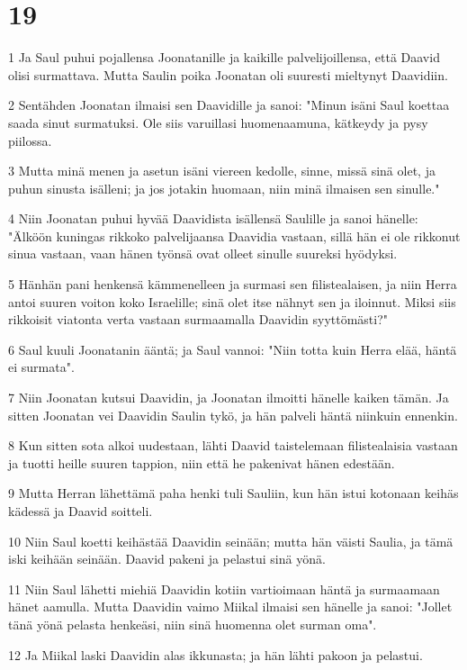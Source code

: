 \chapter{19}

\par 1 Ja Saul puhui pojallensa Joonatanille ja kaikille palvelijoillensa, että Daavid olisi surmattava. Mutta Saulin poika Joonatan oli suuresti mieltynyt Daavidiin.
\par 2 Sentähden Joonatan ilmaisi sen Daavidille ja sanoi: "Minun isäni Saul koettaa saada sinut surmatuksi. Ole siis varuillasi huomenaamuna, kätkeydy ja pysy piilossa.
\par 3 Mutta minä menen ja asetun isäni viereen kedolle, sinne, missä sinä olet, ja puhun sinusta isälleni; ja jos jotakin huomaan, niin minä ilmaisen sen sinulle."
\par 4 Niin Joonatan puhui hyvää Daavidista isällensä Saulille ja sanoi hänelle: "Älköön kuningas rikkoko palvelijaansa Daavidia vastaan, sillä hän ei ole rikkonut sinua vastaan, vaan hänen työnsä ovat olleet sinulle suureksi hyödyksi.
\par 5 Hänhän pani henkensä kämmenelleen ja surmasi sen filistealaisen, ja niin Herra antoi suuren voiton koko Israelille; sinä olet itse nähnyt sen ja iloinnut. Miksi siis rikkoisit viatonta verta vastaan surmaamalla Daavidin syyttömästi?"
\par 6 Saul kuuli Joonatanin ääntä; ja Saul vannoi: "Niin totta kuin Herra elää, häntä ei surmata".
\par 7 Niin Joonatan kutsui Daavidin, ja Joonatan ilmoitti hänelle kaiken tämän. Ja sitten Joonatan vei Daavidin Saulin tykö, ja hän palveli häntä niinkuin ennenkin.
\par 8 Kun sitten sota alkoi uudestaan, lähti Daavid taistelemaan filistealaisia vastaan ja tuotti heille suuren tappion, niin että he pakenivat hänen edestään.
\par 9 Mutta Herran lähettämä paha henki tuli Sauliin, kun hän istui kotonaan keihäs kädessä ja Daavid soitteli.
\par 10 Niin Saul koetti keihästää Daavidin seinään; mutta hän väisti Saulia, ja tämä iski keihään seinään. Daavid pakeni ja pelastui sinä yönä.
\par 11 Niin Saul lähetti miehiä Daavidin kotiin vartioimaan häntä ja surmaamaan hänet aamulla. Mutta Daavidin vaimo Miikal ilmaisi sen hänelle ja sanoi: "Jollet tänä yönä pelasta henkeäsi, niin sinä huomenna olet surman oma".
\par 12 Ja Miikal laski Daavidin alas ikkunasta; ja hän lähti pakoon ja pelastui.
